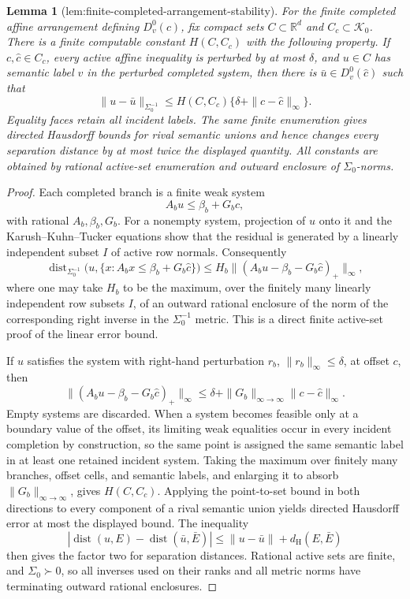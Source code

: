 \documentclass{article}
\newtheorem{lemma}{Lemma}
\begin{document}
\begin{lemma}[lem:finite-completed-arrangement-stability]\label{lem:finite-completed-arrangement-stability}
For the finite completed affine arrangement defining \(D_v^0(c)\), fix compact sets \(C\subset\mathbb R^d\) and \(C_c\subset\mathcal K_0\). There is a finite computable constant \(H(C,C_c)\) with the following property. If \(c,\widehat c\in C_c\), every active affine inequality is perturbed by at most \(\delta\), and \(u\in C\) has semantic label \(v\) in the perturbed completed system, then there is \(\bar u\in D_v^0(\widehat c)\) such that
\[
 \|u-\bar u\|_{\Sigma_0^{-1}}
 \le H(C,C_c)\{\delta+\|c-\widehat c\|_\infty\}.
\]
Equality faces retain all incident labels. The same finite enumeration gives directed Hausdorff bounds for rival semantic unions and hence changes every separation distance by at most twice the displayed quantity. All constants are obtained by rational active-set enumeration and outward enclosure of \(\Sigma_0\)-norms.
\end{lemma}
\begin{proof}
Each completed branch is a finite weak system
\[
 A_bu\le \beta_b+G_bc,
\]
with rational \(A_b,\beta_b,G_b\). For a nonempty system, projection of \(u\) onto it and the Karush--Kuhn--Tucker equations show that the residual is generated by a linearly independent subset \(I\) of active row normals. Consequently
\[
 \operatorname{dist}_{\Sigma_0^{-1}}
 \bigl(u,\{x:A_bx\le\beta_b+G_b\widehat c\}\bigr)
 \le H_b\bigl\|(A_bu-\beta_b-G_b\widehat c)_+\bigr\|_\infty,
\]
where one may take \(H_b\) to be the maximum, over the finitely many linearly independent row subsets \(I\), of an outward rational enclosure of the norm of the corresponding right inverse in the \(\Sigma_0^{-1}\) metric. This is a direct finite active-set proof of the linear error bound.

If \(u\) satisfies the system with right-hand perturbation \(r_b\), \(\|r_b\|_\infty\le\delta\), at offset \(c\), then
\[
 \bigl\|(A_bu-\beta_b-G_b\widehat c)_+\bigr\|_\infty
 \le \delta+\|G_b\|_{\infty\to\infty}\|c-\widehat c\|_\infty.
\]
Empty systems are discarded. When a system becomes feasible only at a boundary value of the offset, its limiting weak equalities occur in every incident completion by construction, so the same point is assigned the same semantic label in at least one retained incident system. Taking the maximum over finitely many branches, offset cells, and semantic labels, and enlarging it to absorb \(\|G_b\|_{\infty\to\infty}\), gives \(H(C,C_c)\). Applying the point-to-set bound in both directions to every component of a rival semantic union yields directed Hausdorff error at most the displayed bound. The inequality
\[
 |\operatorname{dist}(u,E)-\operatorname{dist}(\bar u,\bar E)|
 \le \|u-\bar u\|+d_{\mathrm H}(E,\bar E)
\]
then gives the factor two for separation distances. Rational active sets are finite, and \(\Sigma_0\succ0\), so all inverses used on their ranks and all metric norms have terminating outward rational enclosures.
\end{proof}
\end{document}
